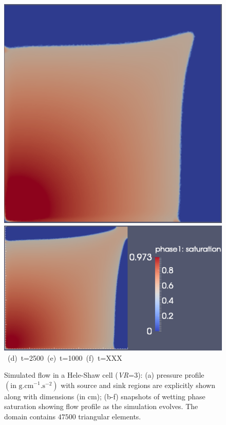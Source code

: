\begin{landscape}
\begin{figure}[ht]
{{      \includegraphics[width=.375\textwidth]{./Pics1/Saffman_homogeneous_MR3/saffman_homo_fixed_3500.pdf} 
      \includegraphics[width=.65\textwidth]{./Pics1/Saffman_homogeneous_MR3/saffman_homo_fixed_end.pdf}}
\vspace{0.cm}
\hbox{ \hspace{1.cm} (d) t=2500 \hspace{2.0cm} (e) t=1000   \hspace{3.0cm} (f) t=XXX}
\vspace{0.cm}
}   
\caption{Simulated flow in a Hele-Shaw cell ({\it VR}=3): (a) pressure profile $\left(\text{in g.cm}^{-1}\text{.s}^{-2}\right)$ with source and sink regions are explicitly shown along with dimensions (in cm); (b-f) snapshots of wetting phase saturation showing flow profile as the simulation evolves. The domain contains $47500$  triangular elements.}
\label{fig:homoheleshaw_VN3}
\end{figure}
\end{landscape}
\clearpage


